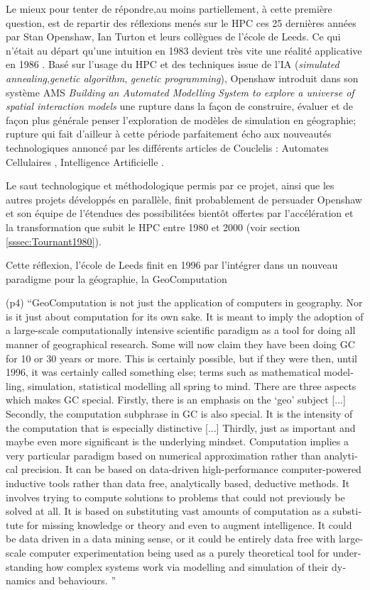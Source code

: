 Le mieux pour tenter de répondre,au moins partiellement, à cette première question, est de repartir des réflexions menés sur le HPC ces 25 dernières années par Stan Openshaw, Ian Turton et leurs collègues de l'école de Leeds. Ce qui n'était au départ qu'une intuition en 1983  devient très vite une réalité applicative en 1986 \autocite{Openshaw1988}. Basé sur l'usage du HPC et des techniques issue de l'IA (\textit{simulated annealing},\textit{genetic algorithm}, \textit{genetic programming}), Openshaw introduit dans son système AMS \textit{Building an Automated Modelling System to explore a universe of spatial interaction models} une rupture dans la façon de construire, évaluer et de façon plus générale penser l'exploration de modèles de simulation en géographie; rupture qui fait d'ailleur à cette période parfaitement écho aux nouveautés technologiques annoncé par les différents articles de Couclelis : Automates Cellulaires \autocite{Couclelis1985}, Intelligence Artificielle \autocite{Couclelis1986}.

Le saut technologique et méthodologique permis par ce projet, ainsi que les autres projets développés en parallèle, finit probablement de persuader Openshaw et son équipe de l'étendues des possibilitées bientôt offertes par l'accélération et la transformation que subit le HPC entre 1980 et 2000 (voir section \ref{sssec:Tournant1980}).

Cette réflexion, l'école de Leeds finit en 1996 par l'intégrer dans un nouveau paradigme pour la géographie, la GeoComputation \autocite{Openshaw2000b}

(p4) \foreignquote{english}{GeoComputation is not just the application of computers in geography. Nor is it just about computation for its own sake. It is meant to imply the adoption of a large-scale computationally intensive scientific paradigm as a tool for doing all manner of geographical research. Some will now claim they have been doing GC for 10 or 30 years or more. This is certainly possible, but if they were then, until 1996, it was certainly called something else; terms such as mathematical modelling, simulation, statistical modelling all spring to mind. There are three aspects which makes GC special. Firstly, there is an emphasis on the ‘geo’ subject [...] Secondly, the computation subphrase in GC is also special. It is the intensity of the computation that is especially distinctive [...] Thirdly, just as important and maybe even more significant is the underlying mindset. Computation implies a very particular paradigm based on numerical approximation rather than analytical precision. It can be based on data-driven high-performance computer-powered inductive tools rather than data free, analytically based, deductive methods. It involves trying to compute solutions to problems that could not previously be solved at all. It is based on substituting vast amounts of  computation as a substitute for missing knowledge or theory and even to augment intelligence. It could be data driven in a data mining sense, or it could be entirely data free with large-scale computer experimentation being used as a purely theoretical tool for understanding how complex systems work via modelling and simulation of their dynamics and behaviours. }

